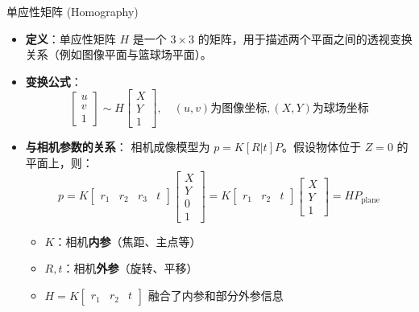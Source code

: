\documentclass{ctexbeamer}
\begin{document}
\begin{frame}{单应性矩阵 (Homography)}
  \small %
  \begin{itemize}
    \setlength{\itemsep}{0.5em} %
    \item \textbf{定义}：单应性矩阵 $H$ 是一个 $3 \times 3$ 的矩阵，用于描述两个平面之间的透视变换关系（例如图像平面与篮球场平面）。
    \item \textbf{变换公式}：
      $$ \begin{bmatrix} u \\ v \\ 1 \end{bmatrix} \sim H \begin{bmatrix} X \\ Y \\ 1 \end{bmatrix}, \quad (u,v)\text{为图像坐标}, (X,Y)\text{为球场坐标} $$
    \item \textbf{与相机参数的关系}：
      相机成像模型为 $p = K [R | t] P$。假设物体位于 $Z=0$ 的平面上，则：
      $$ p = K \begin{bmatrix} r_1 & r_2 & r_3 & t \end{bmatrix} \begin{bmatrix} X \\ Y \\ 0 \\ 1 \end{bmatrix} = K \begin{bmatrix} r_1 & r_2 & t \end{bmatrix} \begin{bmatrix} X \\ Y \\ 1 \end{bmatrix} = H P_{\text{plane}} $$
      \vspace{-0.5em} %
      \begin{itemize}
        \item $K$：相机\textbf{内参}（焦距、主点等）
        \item $R, t$：相机\textbf{外参}（旋转、平移）
        \item $H = K \begin{bmatrix} r_1 & r_2 & t \end{bmatrix}$ 融合了内参和部分外参信息
      \end{itemize}
  \end{itemize}
\end{frame}
\end{document}
